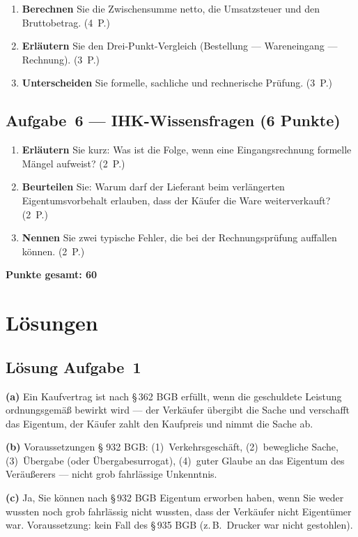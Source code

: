 \documentclass[11pt, a4paper]{article}
\begin{document}
\begin{enumerate}[label=(\alph*)]
  \item \textbf{Berechnen} Sie die Zwischensumme netto, die Umsatzsteuer und den Bruttobetrag. \hfill (4~P.)
  \item \textbf{Erläutern} Sie den Drei-Punkt-Vergleich (Bestellung --- Wareneingang --- Rechnung). \hfill (3~P.)
  \item \textbf{Unterscheiden} Sie formelle, sachliche und rechnerische Prüfung. \hfill (3~P.)
\end{enumerate}

\subsection*{Aufgabe~6 --- IHK-Wissensfragen (6 Punkte)}

\begin{enumerate}[label=(\alph*)]
  \item \textbf{Erläutern} Sie kurz: Was ist die Folge, wenn eine Eingangsrechnung formelle Mängel aufweist? \hfill (2~P.)
  \item \textbf{Beurteilen} Sie: Warum darf der Lieferant beim verlängerten Eigentumsvorbehalt erlauben, dass der Käufer die Ware weiterverkauft? \hfill (2~P.)
  \item \textbf{Nennen} Sie zwei typische Fehler, die bei der Rechnungsprüfung auffallen können. \hfill (2~P.)
\end{enumerate}

\vspace{1em}
\noindent\textbf{Punkte gesamt: 60}

\newpage

\section{Lösungen}\label{loesungen}

\subsection*{Lösung Aufgabe~1}

\begin{loesung}
\textbf{(a)} Ein Kaufvertrag ist nach §\,362 BGB erfüllt, wenn die geschuldete Leistung
ordnungsgemäß bewirkt wird --- der Verkäufer übergibt die Sache und verschafft das
Eigentum, der Käufer zahlt den Kaufpreis und nimmt die Sache ab.

\textbf{(b)} Voraussetzungen § 932 BGB: (1)~Verkehrsgeschäft, (2)~bewegliche Sache,
(3)~Übergabe (oder Übergabesurrogat), (4)~guter Glaube an das Eigentum des
Veräußerers --- nicht grob fahrlässige Unkenntnis.

\textbf{(c)} Ja, Sie können nach §\,932 BGB Eigentum erworben haben, wenn Sie weder
wussten noch grob fahrlässig nicht wussten, dass der Verkäufer nicht Eigentümer war.
Voraussetzung: kein Fall des §\,935 BGB (z.\,B.\ Drucker war nicht gestohlen).
\end{loesung}
\end{document}
